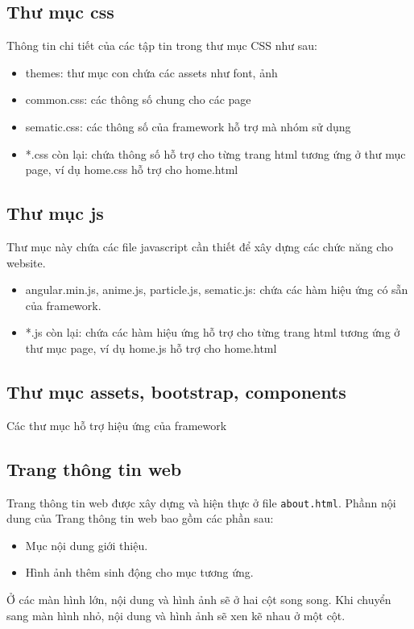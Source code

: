 \documentclass[a4paper]{article}
\begin{document}
\subsection{Thư mục css}
Thông tin chi tiết của các tập tin trong thư mục CSS như sau:

\begin{itemize}
    \item themes: thư mục con chứa các assets như font, ảnh
    \item common.css: các thông số chung cho các page
    \item sematic.css: các thông số của framework hỗ trợ mà nhóm sử dụng
    \item *.css còn lại: chứa thông số hỗ trợ cho từng trang html tương ứng ở thư mục page, ví dụ home.css hỗ trợ cho home.html
\end{itemize}

\subsection{Thư mục js}
Thư mục này chứa các file javascript cần thiết để xây dựng các chức năng cho website.
\begin{itemize}
    \item angular.min.js, anime.js, particle.js, sematic.js: chứa các hàm hiệu ứng có sẵn của framework.
    \item *.js còn lại: chứa các hàm hiệu ứng hỗ trợ cho từng trang html tương ứng ở thư mục page, ví dụ home.js hỗ trợ cho home.html
\end{itemize}

\subsection{Thư mục assets, bootstrap, components}
Các thư mục hỗ trợ hiệu ứng của framework


\subsection{Trang thông tin web}
Trang thông tin web được xây dựng và hiện thực ở file \texttt{about.html}. Phầnn nội dung của Trang thông tin web bao gồm các phần sau:
\begin{itemize}
    \item Mục nội dung giới thiệu.
    \item Hình ảnh thêm sinh động cho mục tương ứng.
\end{itemize}
Ở các màn hình lớn, nội dung và hình ảnh sẽ ở hai cột song song. Khi chuyển sang màn hình nhỏ, nội dung và hình ảnh sẽ xen kẽ nhau ở một cột.
\end{document}
